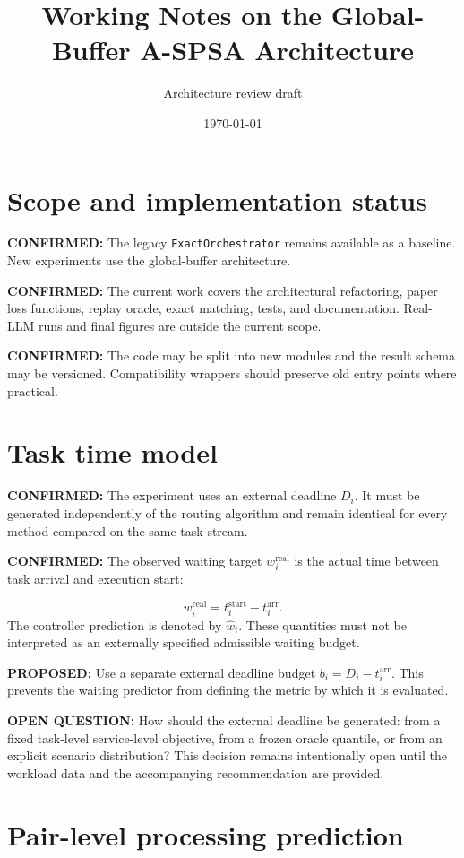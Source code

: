 \documentclass[11pt]{article}
\title{Working Notes on the Global-Buffer A-SPSA Architecture}
\author{Architecture review draft}
\date{\today}
\newcommand{\Confirmed}[1]{\par\noindent\textcolor{confirmed}{\textbf{CONFIRMED:} #1}\par}
\newcommand{\Proposal}[1]{\par\noindent\textcolor{proposal}{\textbf{PROPOSED:} #1}\par}
\newcommand{\Question}[1]{\par\noindent\textcolor{question}{\textbf{OPEN QUESTION:} #1}\par}
\begin{document}
\maketitle

\section{Scope and implementation status}

\Confirmed{The legacy \texttt{ExactOrchestrator} remains available as a
baseline. New experiments use the global-buffer architecture.}

\Confirmed{The current work covers the architectural refactoring, paper loss
functions, replay oracle, exact matching, tests, and documentation. Real-LLM
runs and final figures are outside the current scope.}

\Confirmed{The code may be split into new modules and the result schema may be
versioned. Compatibility wrappers should preserve old entry points where
practical.}

\section{Task time model}

\Confirmed{The experiment uses an external deadline $D_i$. It must be generated
independently of the routing algorithm and remain identical for every method
compared on the same task stream.}

\Confirmed{The observed waiting target $w_i^{\mathrm{real}}$ is the actual time
between task arrival and execution start:}
\begin{equation}
 w_i^{\mathrm{real}}=t_i^{\mathrm{start}}-t_i^{\mathrm{arr}}.
\end{equation}
The controller prediction is denoted by $\widehat w_i$. These quantities must
not be interpreted as an externally specified admissible waiting budget.

\Proposal{Use a separate external deadline budget $b_i=D_i-t_i^{\mathrm{arr}}$.
This prevents the waiting predictor from defining the metric by which it is
evaluated.}

\Question{How should the external deadline be generated: from a fixed
task-level service-level objective, from a frozen oracle quantile, or from an
explicit scenario distribution? This decision remains intentionally open until
the workload data and the accompanying recommendation are provided.}

\section{Pair-level processing prediction}
\end{document}
